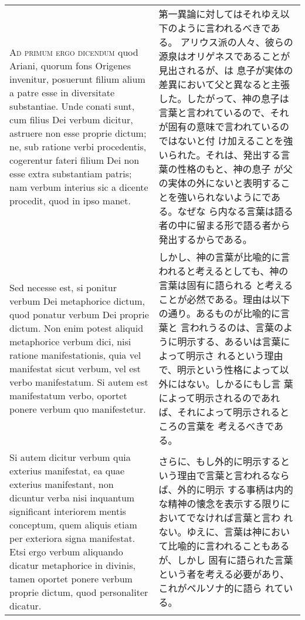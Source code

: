 \documentclass[10pt]{jsarticle} %
\begin{document}
\begin{longtable}{p{21em}p{21em}}
\\




{\scshape Ad primum ergo dicendum} quod Ariani, quorum fons Origenes invenitur,
 posuerunt filium alium a patre esse in diversitate substantiae. Unde
 conati sunt, cum filius Dei verbum dicitur, astruere non esse proprie
 dictum; ne, sub ratione verbi procedentis, cogerentur fateri filium
 Dei non esse extra substantiam patris; nam verbum interius sic a
 dicente procedit, quod in ipso manet. 

&

第一異論に対してはそれゆえ以下のように言われるべきである。
アリウス派の人々、彼らの源泉はオリゲネスであることが見出されるが、は
 息子が実体の差異において父と異なると主張した。したがって、神の息子は
 言葉と言われているので、それが固有の意味で言われているのではないと付
 け加えることを強いられた。それは、発出する言葉の性格のもと、神の息子
 が父の実体の外にないと表明することを強いられないようにである。なぜな
 ら内なる言葉は語る者の中に留まる形で語る者から発出するからである。

\\



Sed necesse est, si ponitur
 verbum Dei metaphorice dictum, quod ponatur verbum Dei proprie
 dictum. Non enim potest aliquid metaphorice verbum dici, nisi ratione
 manifestationis, quia vel manifestat sicut verbum, vel est verbo
 manifestatum. Si autem est manifestatum verbo, oportet ponere verbum
 quo manifestetur. 

&

しかし、神の言葉が比喩的に言われると考えるとしても、神の言葉は固有に語られる
 と考えることが必然である。理由は以下の通り。あるものが比喩的に言葉と
 言われうるのは、言葉のように明示する、あるいは言葉によって明示さ
 れるという理由で、明示という性格によって以外にはない。しかるにもし言
 葉によって明示されるのであれば、それによって明示されるところの言葉を
 考えるべきである。


\\


Si autem dicitur verbum quia exterius manifestat,
 ea quae exterius manifestant, non dicuntur verba nisi inquantum
 significant interiorem mentis conceptum, quem aliquis etiam per
 exteriora signa manifestat. Etsi ergo verbum aliquando dicatur
 metaphorice in divinis, tamen oportet ponere verbum proprie dictum,
 quod personaliter dicatur.

&

さらに、もし外的に明示するという理由で言葉と言われるならば、外的に明示
 する事柄は内的な精神の懐念を表示する限りにおいてでなければ言葉と言わ
 れない。ゆえに、言葉は神において比喩的に言われることもあるが、しかし
 固有に語られた言葉という者を考える必要があり、これがペルソナ的に語ら
 れている。



\end{longtable}
\end{document}
